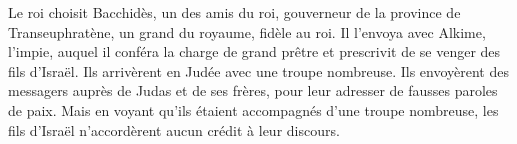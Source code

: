 Le roi choisit Bacchidès, un des amis du roi,
	gouverneur de la province de Transeuphratène, un grand du royaume, fidèle au roi.
Il l’envoya avec Alkime, l’impie, auquel il conféra la charge de grand prêtre
	et prescrivit de se venger des fils d’Israël.
Ils arrivèrent en Judée avec une troupe nombreuse.
Ils envoyèrent des messagers auprès de Judas et de ses frères,
	pour leur adresser de fausses paroles de paix.
Mais en voyant qu’ils étaient accompagnés d’une troupe nombreuse,
	les fils d’Israël n’accordèrent aucun crédit à leur discours.
